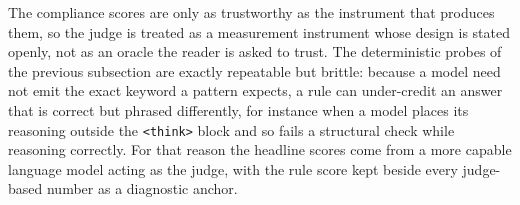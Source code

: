 The compliance scores are only as trustworthy as the instrument that produces them, so the judge is treated as a measurement instrument whose design is stated openly, not as an oracle the reader is asked to trust. The deterministic probes of the previous subsection are exactly repeatable but brittle: because a model need not emit the exact keyword a pattern expects, a rule can under-credit an answer that is correct but phrased differently, for instance when a model places its reasoning outside the \texttt{<think>} block and so fails a structural check while reasoning correctly. For that reason the headline scores come from a more capable language model acting as the judge, with the rule score kept beside every judge-based number as a diagnostic anchor.

